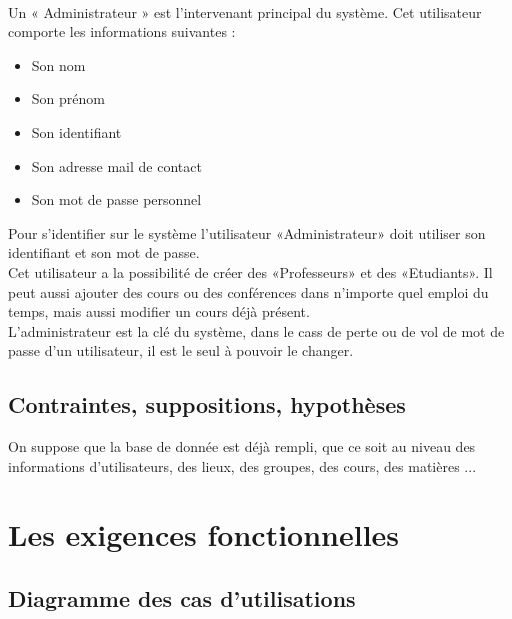 \documentclass[a4paper, 11pt]{article}
\begin{document}
\\Un « Administrateur » est l'intervenant principal du système. Cet utilisateur comporte les informations suivantes :
        \begin{itemize}
        \item Son nom
        \item Son prénom
        \item Son identifiant
        \item Son adresse mail de contact
        \item Son mot de passe personnel
        \end{itemize}
Pour s'identifier sur le système l'utilisateur «Administrateur» doit utiliser son identifiant et son mot de passe.\\
Cet utilisateur a la possibilité de créer des «Professeurs» et des «Etudiants». Il peut aussi ajouter des cours ou des conférences dans n'importe quel emploi du temps, mais aussi modifier un cours déjà présent.\\L'administrateur est la clé du système, dans le cass de perte ou de vol de mot de passe d'un utilisateur, il est le seul à pouvoir le changer.
        \subsection{ Contraintes, suppositions, hypothèses}
        On suppose que la base de donnée est déjà rempli, que ce soit au niveau des informations d'utilisateurs, des lieux, des groupes, des cours, des matières ...
        \clearpage
        \section{ Les exigences fonctionnelles}
        \subsection{ Diagramme des cas d'utilisations}
\end{document}
